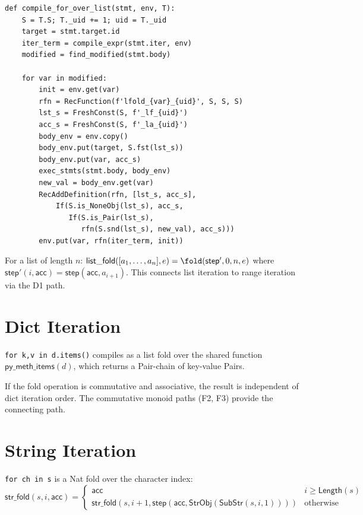 \begin{lstlisting}[caption={List fold Z3 RecFunction}]
def compile_for_over_list(stmt, env, T):
    S = T.S; T._uid += 1; uid = T._uid
    target = stmt.target.id
    iter_term = compile_expr(stmt.iter, env)
    modified = find_modified(stmt.body)

    for var in modified:
        init = env.get(var)
        rfn = RecFunction(f'lfold_{var}_{uid}', S, S, S)
        lst_s = FreshConst(S, f'_lf_{uid}')
        acc_s = FreshConst(S, f'_la_{uid}')
        body_env = env.copy()
        body_env.put(target, S.fst(lst_s))
        body_env.put(var, acc_s)
        exec_stmts(stmt.body, body_env)
        new_val = body_env.get(var)
        RecAddDefinition(rfn, [lst_s, acc_s],
            If(S.is_NoneObj(lst_s), acc_s,
               If(S.is_Pair(lst_s),
                  rfn(S.snd(lst_s), new_val), acc_s)))
        env.put(var, rfn(iter_term, init))
\end{lstlisting}

\begin{theorem}[List Fold = Nat Fold on Length]
For a list of length $n$: $\mathsf{list\_fold}([a_1,\ldots,a_n], e)
= \fold(\mathsf{step}', 0, n, e)$ where $\mathsf{step}'(i, \mathsf{acc})
= \mathsf{step}(\mathsf{acc}, a_{i+1})$.  This connects list iteration
to range iteration via the D1 path.
\end{theorem}

\section{Dict Iteration}

\texttt{for k,v in d.items()} compiles as a list fold over the shared
function $\mathsf{py\_meth\_items}(d)$, which returns a Pair-chain of
key-value Pairs.

\begin{proposition}
If the fold operation is commutative and associative, the result is
independent of dict iteration order.  The commutative monoid paths
(F2, F3) provide the connecting path.
\end{proposition}

\section{String Iteration}

\texttt{for ch in s} is a Nat fold over the character index:
$\mathsf{str\_fold}(s, i, \mathsf{acc}) = \begin{cases}
\mathsf{acc} & i \geq \mathsf{Length}(s) \\
\mathsf{str\_fold}(s, i{+}1, \mathsf{step}(\mathsf{acc},
  \mathsf{StrObj}(\mathsf{SubStr}(s, i, 1)))) & \text{otherwise}
\end{cases}$

